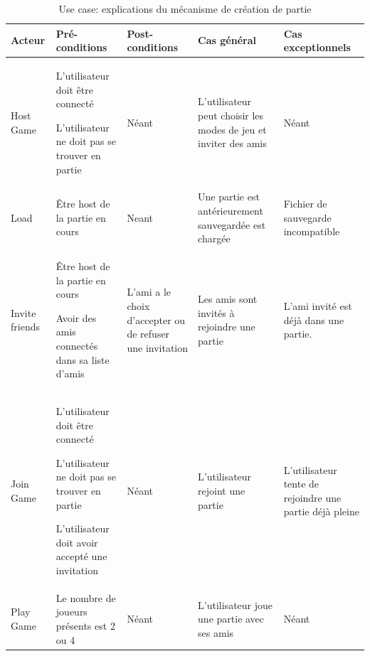 \documentclass[a4paper,10pt]{article}
\begin{document}
\begin{table}[H]
\begin{tabular}{|p{3.5cm}|p{3cm}|p{3cm}|p{3cm}|p{3cm}|}
\hline
\textbf{Acteur} & \textbf{Pré-conditions} & \textbf{Post-conditions} & \textbf{Cas général}& \textbf{Cas exceptionnels} \\
\hline
Host Game & L'utilisateur doit être connecté

	L'utilisateur ne doit pas se trouver en partie& Néant  & L'utilisateur peut choisir les modes de jeu et inviter des amis & Néant\\
\hline


	
Load & Être host de la partie en cours & Neant & Une partie est antérieurement sauvegardée est chargée & Fichier de sauvegarde incompatible\\
\hline
Invite friends & Être host de la partie en cours

Avoir des amis connectés dans sa liste d'amis 
& L'ami a le choix d'accepter ou de refuser une invitation & Les amis sont invités à rejoindre une partie & L'ami invité est déjà dans une partie.\\
\hline
Join Game &
	L'utilisateur doit être connecté

	L'utilisateur ne doit pas se trouver en partie

	L'utilisateur doit avoir accepté une invitation & Néant  & L'utilisateur rejoint une partie & L'utilisateur tente de rejoindre une partie déjà pleine\\
\hline
Play Game& Le nombre de joueurs présents est 2 ou 4 & Néant  & L'utilisateur joue une partie avec ses amis & Néant\\
\hline


\end{tabular}
	\caption{Use case: explications du mécanisme de création de partie}
\end{table}
\end{document}
